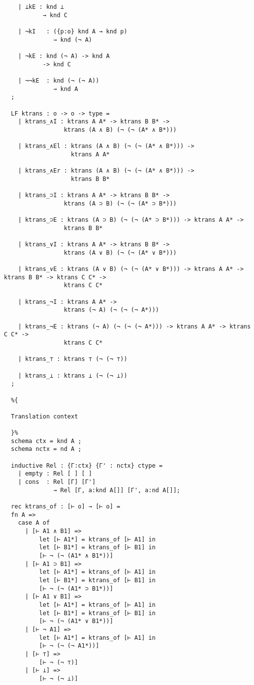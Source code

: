\documentclass{article}
\begin{document}
\begin{lstlisting}
    | ⊥kE : knd ⊥
           → knd C
    
    | ¬kI   : ({p:o} knd A → knd p)
              → knd (¬ A)
  
    | ¬kE : knd (¬ A) -> knd A
           -> knd C
               
    | ¬¬kE  : knd (¬ (¬ A))
              → knd A
  ;
  
  LF ktrans : o -> o -> type =
    | ktrans_∧I : ktrans A A* -> ktrans B B* -> 
                 ktrans (A ∧ B) (¬ (¬ (A* ∧ B*)))
  
    | ktrans_∧El : ktrans (A ∧ B) (¬ (¬ (A* ∧ B*))) ->
                   ktrans A A*
  
    | ktrans_∧Er : ktrans (A ∧ B) (¬ (¬ (A* ∧ B*))) ->
                   ktrans B B*
  
    | ktrans_⊃I : ktrans A A* -> ktrans B B* -> 
                 ktrans (A ⊃ B) (¬ (¬ (A* ⊃ B*)))
  
    | ktrans_⊃E : ktrans (A ⊃ B) (¬ (¬ (A* ⊃ B*))) -> ktrans A A* ->
                 ktrans B B*
  
    | ktrans_∨I : ktrans A A* -> ktrans B B* -> 
                 ktrans (A ∨ B) (¬ (¬ (A* ∨ B*)))
    
    | ktrans_∨E : ktrans (A ∨ B) (¬ (¬ (A* ∨ B*))) -> ktrans A A* -> ktrans B B* -> ktrans C C* ->
                 ktrans C C*
  
    | ktrans_¬I : ktrans A A* ->
                 ktrans (¬ A) (¬ (¬ (¬ A*)))
    
    | ktrans_¬E : ktrans (¬ A) (¬ (¬ (¬ A*))) -> ktrans A A* -> ktrans C C* ->
                 ktrans C C*
  
    | ktrans_⊤ : ktrans ⊤ (¬ (¬ ⊤))
    
    | ktrans_⊥ : ktrans ⊥ (¬ (¬ ⊥))
  ;
  
  %{
  
  Translation context
  
  }%
  schema ctx = knd A ;
  schema nctx = nd A ;
  
  inductive Rel : {Γ:ctx} {Γ' : nctx} ctype =
    | empty : Rel [ ] [ ]
    | cons  : Rel [Γ] [Γ']
              → Rel [Γ, a:knd A[]] [Γ', a:nd A[]];
  
  rec ktrans_of : [⊢ o] → [⊢ o] =
  fn A =>
    case A of
      | [⊢ A1 ∧ B1] =>
          let [⊢ A1*] = ktrans_of [⊢ A1] in
          let [⊢ B1*] = ktrans_of [⊢ B1] in
          [⊢ ¬ (¬ (A1* ∧ B1*))]
      | [⊢ A1 ⊃ B1] =>
          let [⊢ A1*] = ktrans_of [⊢ A1] in
          let [⊢ B1*] = ktrans_of [⊢ B1] in
          [⊢ ¬ (¬ (A1* ⊃ B1*))]
      | [⊢ A1 ∨ B1] =>
          let [⊢ A1*] = ktrans_of [⊢ A1] in
          let [⊢ B1*] = ktrans_of [⊢ B1] in
          [⊢ ¬ (¬ (A1* ∨ B1*))]
      | [⊢ ¬ A1] =>
          let [⊢ A1*] = ktrans_of [⊢ A1] in
          [⊢ ¬ (¬ (¬ A1*))]
      | [⊢ ⊤] =>
          [⊢ ¬ (¬ ⊤)]
      | [⊢ ⊥] =>
          [⊢ ¬ (¬ ⊥)]
      

\end{lstlisting}
\end{document}
